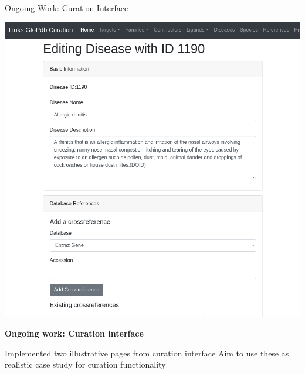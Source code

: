 \documentclass[11.5pt, aspectratio=169]{beamer}
\begin{document}

\begin{frame}{Ongoing Work: Curation Interface}

  \begin{minipage}{0.45\textwidth}
  \begin{center}
    \includegraphics[width=\textwidth]{images/curation-interface.png}
  \end{center}
  \end{minipage}
  \hfill
  \begin{minipage}{0.5\textwidth}
  \begin{fullpageitemize}
  \item {\large \textbf{Ongoing work: Curation interface}}
    \begin{itemize}
      \itemR Implemented two illustrative pages from curation interface
      \itemR Aim to use these as realistic case study for curation functionality
    \end{itemize}
  \end{fullpageitemize}
\end{minipage}
\end{frame}
\end{document}
